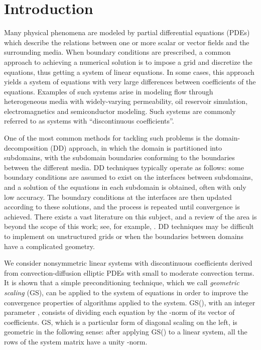 \documentclass[12pt,a4paper]{article}
\newcounter{i}
\begin{document}
\section{Introduction}

Many physical phenomena are modeled by partial differential equations 
(PDEs) which describe the relations between one or more scalar or vector 
fields and the surrounding media.  When boundary conditions are prescribed, 
a common approach to achieving a numerical solution is to impose a grid 
and discretize the equations, thus getting a system of linear equations.  
In some cases, this approach yields a system of equations with very large 
differences between coefficients of the equations.  Examples of such 
systems arise in modeling flow through heterogeneous media with 
widely-varying permeability, oil reservoir simulation, electromagnetics 
and semiconductor modeling.  Such systems are commonly referred to as 
systems with ``discontinuous coefficients''.  

One of the most common methods for tackling such problems is 
the domain-decomposition (DD) approach, in which the domain 
is partitioned into subdomains, with the subdomain boundaries 
conforming to the boundaries between the different media.  
DD techniques typically operate as follows: some boundary 
conditions are assumed to exist on the interfaces between 
subdomains, and a solution of the equations in each subdomain 
is obtained, often with only low accuracy.  The boundary 
conditions at the interfaces are then updated according to 
these solutions, and the process is repeated until convergence 
is achieved.  There exists a vast literature on this subject, 
and a review of the area is beyond the scope of this work; 
see, for example, \cite{Glowinski88,Smith96,Quarteroni99,Rice00}.  
DD techniques may be difficult to implement on unstructured 
grids or when the boundaries between domains have a 
complicated geometry.

We consider nonsymmetric linear systems with discontinuous 
coefficients derived from convection-diffusion elliptic PDEs 
with small to moderate convection terms.  It is shown that a 
simple preconditioning technique, which we call {\em geometric 
scaling} (GS), can be applied to the system of equations in 
order to improve the convergence properties of algorithms
applied to the system.  GS(), with an integer parameter 
, consists of dividing each equation by the -norm 
of its vector of coefficients.  GS, which is a particular form 
of diagonal scaling on the left, is geometric in the following
sense: after applying GS() to a linear system, all the rows
of the system matrix have a unity -norm.
\end{document}
